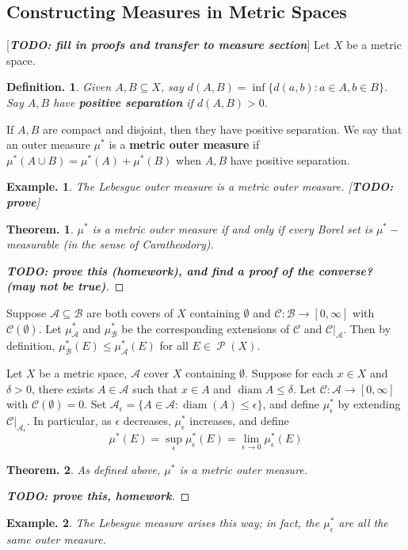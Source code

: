 \documentclass[11pt, a4paper]{memoir}
\theoremstyle{change}
\newtheorem{theorem}{Theorem.}[section]
\theoremstyle{plain}
\theoremstyle{nonumberplain}
\newtheorem{definition}{Definition.}
\newtheorem{example}{Example.}
\newtheorem{proof}{Proof}
\DeclareMathOperator{\ps}{{\mathcal{P}}}
\newcommand{\defn}[1]{{\boldmath\bfseries #1}}
\newcommand{\TODO}[1]{[\textit{\textbf{TODO: #1}}]}
\DeclareMathOperator{\diam}{diam}
\numberwithin{equation}{section}
\begin{document}
\subsection{Constructing Measures in Metric Spaces}
\TODO{fill in proofs and transfer to measure section}
Let $X$ be a metric space.
\begin{definition}
    Given $A,B\subseteq X$, say $d(A,B)=\inf\{d(a,b):a\in A,b\in B\}$.
    Say $A,B$ have \defn{positive separation} if $d(A,B)>0$.
\end{definition}
If $A,B$ are compact and disjoint, then they have positive separation.
We say that an outer measure $\mu^*$ is a \defn{metric outer measure} if $\mu^*(A\cup B)=\mu^*(A)+\mu^*(B)$ when $A,B$ have positive separation.
\begin{example}
    The Lebesgue outer measure is a metric outer measure.
    \TODO{prove}
\end{example}
\begin{theorem}
    $\mu^*$ is a metric outer measure if and only if every Borel set is $\mu^*-$measurable (in the sense of Caratheodory).
\end{theorem}
\begin{proof}
    \TODO{prove this (homework), and find a proof of the converse? (may not be true)}
\end{proof}
Suppose $\mathcal{A}\subseteq\mathcal{B}$ are both covers of $X$ containing $\emptyset$ and $\mathcal{C}:\mathcal{B}\to[0,\infty]$ with $\mathcal{C}(\emptyset)$.
Let $\mu^*_{\mathcal{A}}$ and $\mu^*_{\mathcal{B}}$ be the corresponding extensions of $\mathcal{C}$ and $\mathcal{C}|_{\mathcal{A}}$.
Then by definition, $\mu^*_{\mathcal{B}}(E)\leq\mu^*_{\mathcal{A}}(E)$ for all $E\in\ps(X)$.

Let $X$ be a metric space, $\mathcal{A}$ cover $X$ containing $\emptyset$.
Suppose for each $x\in X$ and $\delta>0$, there exists $A\in\mathcal{A}$ such that $x\in A$ and $\diam A\leq\delta$.
Let $\mathcal{C}:\mathcal{A}\to[0,\infty]$ with $\mathcal{C}(\emptyset)=0$.
Set $\mathcal{A}_\epsilon=\{A\in\mathcal{A}:\diam(A)\leq\epsilon\}$, and define $\mu^*_\epsilon$ by extending $\mathcal{C}|_{\mathcal{A}_\epsilon}$.
In particular, as $\epsilon$ decreases, $\mu^*_\epsilon$ increases, and define
\begin{equation*}
    \mu^*(E)=\sup_\epsilon\mu_\epsilon^*(E)=\lim_{\epsilon\to 0}\mu_\epsilon^*(E)
\end{equation*}
\begin{theorem}\label{t:metout}
    As defined above, $\mu^*$ is a metric outer measure.
\end{theorem}
\begin{proof}
    \TODO{prove this, homework}
\end{proof}
\begin{example}
    The Lebesgue measure arises this way; in fact, the $\mu_\epsilon^*$ are all the same outer measure.
\end{example}
\end{document}
